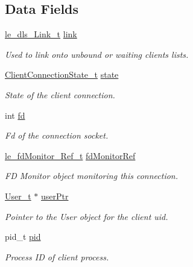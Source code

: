\subsection*{Data Fields}
\begin{DoxyCompactItemize}
\item 
\hyperlink{structle__dls___link__t}{le\+\_\+dls\+\_\+\+Link\+\_\+t} \hyperlink{struct_client_connection__t_a1ce06079f1089ee0f63fd8cd490c1996}{link}
\begin{DoxyCompactList}\small\item\em Used to link onto unbound or waiting clients lists. \end{DoxyCompactList}\item 
\hyperlink{service_directory_8c_afb9b37b212e053a5ed2cfc964efbf5e6}{Client\+Connection\+State\+\_\+t} \hyperlink{struct_client_connection__t_a577447cd82bbf6d16eb70625d745d63e}{state}
\begin{DoxyCompactList}\small\item\em State of the client connection. \end{DoxyCompactList}\item 
int \hyperlink{struct_client_connection__t_a7aeb2d0e7d5277f259b6c20e682ffc12}{fd}
\begin{DoxyCompactList}\small\item\em Fd of the connection socket. \end{DoxyCompactList}\item 
\hyperlink{le__fd_monitor_8h_a85048556f0b95147af81e76907895d42}{le\+\_\+fd\+Monitor\+\_\+\+Ref\+\_\+t} \hyperlink{struct_client_connection__t_ae609b49ba3964ce22f04bd97ffdbac2d}{fd\+Monitor\+Ref}
\begin{DoxyCompactList}\small\item\em FD Monitor object monitoring this connection. \end{DoxyCompactList}\item 
\hyperlink{struct_user__t}{User\+\_\+t} $\ast$ \hyperlink{struct_client_connection__t_abfd97528c8e2b647a648baf15f62670a}{user\+Ptr}
\begin{DoxyCompactList}\small\item\em Pointer to the User object for the client uid. \end{DoxyCompactList}\item 
pid\+\_\+t \hyperlink{struct_client_connection__t_ab644f93f66ef9bb999207d83ebd7c5af}{pid}
\begin{DoxyCompactList}\small\item\em Process ID of client process. \end{DoxyCompactList}\item 

\end{DoxyCompactItemize}
